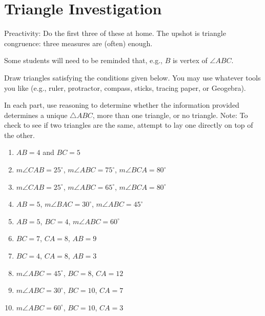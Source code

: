 \newpage

\section{Triangle Investigation}

\begin{teachingnote}
Preactivity:  Do the first three of these at home.  The upshot is triangle congruence:  three measures are (often) enough.  

Some students will need to be reminded that, e.g., $B$ is vertex of $\angle ABC$.
\end{teachingnote}

\begin{prob}
Draw triangles satisfying the conditions given below.  You may use whatever tools you like (e.g., ruler, protractor, compass, sticks, tracing paper, or Geogebra).  

In each part, use reasoning to determine whether the information provided determines a unique $\triangle ABC$, more than one triangle, or no triangle.   Note:  To check to see if two triangles are the same, attempt to lay one directly on top of the other.  

\begin{enumerate}

\item $AB = 4$ and $BC = 5$
\item $m\angle CAB = 25^\circ$, $m\angle ABC = 75^\circ$, $m\angle BCA = 80^\circ$
\item $m\angle CAB = 25^\circ$, $m\angle ABC = 65^\circ$, $m\angle BCA = 80^\circ$
\item $AB = 5$, $m\angle BAC = 30^\circ$, $m\angle ABC = 45^\circ$
\item $AB = 5$, $BC = 4$, $m\angle ABC = 60^\circ$
\item $BC = 7$, $CA = 8$, $AB = 9$
\item $BC = 4$, $CA = 8$, $AB = 3$
\item $m\angle ABC = 45^\circ$, $BC = 8$, $CA = 12$
\item $m\angle ABC = 30^\circ$, $BC = 10$, $CA = 7$
\item $m\angle ABC = 60^\circ$, $BC = 10$, $CA = 3$

\end{enumerate}

\end{prob}
